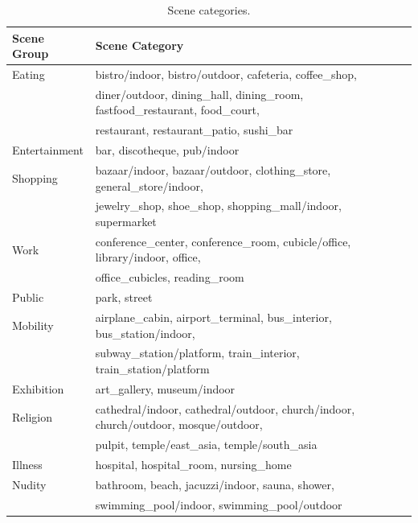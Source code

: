 \begin{table}[tb]
\centering
\caption{Scene categories.}
\label{tbl-scenecate}
\begin{tabular}{ll}
\toprule
Scene Group    & Scene Category                                       \\ \midrule
Eating         & bistro/indoor, bistro/outdoor, cafeteria, coffee\_shop, \\
               & diner/outdoor, dining\_hall, dining\_room, fastfood\_restaurant, food\_court, \\
               & restaurant, restaurant\_patio, sushi\_bar            \\ \midrule
Entertainment  & bar, discotheque, pub/indoor                         \\ \midrule
Shopping       & bazaar/indoor, bazaar/outdoor, clothing\_store, general\_store/indoor, \\
               & jewelry\_shop, shoe\_shop, shopping\_mall/indoor, supermarket  \\ \midrule
Work           & conference\_center, conference\_room, cubicle/office, library/indoor, office, \\
               & office\_cubicles, reading\_room                      \\ \midrule
Public         & park, street                                         \\ \midrule
Mobility       & airplane\_cabin, airport\_terminal, bus\_interior, bus\_station/indoor, \\
               & subway\_station/platform, train\_interior, train\_station/platform \\ \midrule
Exhibition     & art\_gallery, museum/indoor                          \\ \midrule
Religion       & cathedral/indoor, cathedral/outdoor, church/indoor, church/outdoor, mosque/outdoor, \\
               & pulpit, temple/east\_asia, temple/south\_asia        \\ \midrule
Illness        & hospital, hospital\_room, nursing\_home                \\ \midrule
Nudity         & bathroom, beach, jacuzzi/indoor, sauna, shower, \\
               & swimming\_pool/indoor, swimming\_pool/outdoor        \\ \bottomrule
\end{tabular}
\end{table}

